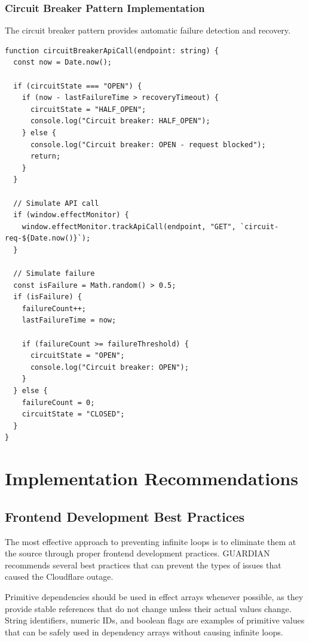 \documentclass[10pt]{article}
\begin{document}
\subsubsection{Circuit Breaker Pattern Implementation}

The circuit breaker pattern provides automatic failure detection and recovery.

\begin{lstlisting}[caption={Circuit Breaker Pattern Implementation}]
function circuitBreakerApiCall(endpoint: string) {
  const now = Date.now();
  
  if (circuitState === "OPEN") {
    if (now - lastFailureTime > recoveryTimeout) {
      circuitState = "HALF_OPEN";
      console.log("Circuit breaker: HALF_OPEN");
    } else {
      console.log("Circuit breaker: OPEN - request blocked");
      return;
    }
  }

  // Simulate API call
  if (window.effectMonitor) {
    window.effectMonitor.trackApiCall(endpoint, "GET", `circuit-req-${Date.now()}`);
  }

  // Simulate failure
  const isFailure = Math.random() > 0.5;
  if (isFailure) {
    failureCount++;
    lastFailureTime = now;
    
    if (failureCount >= failureThreshold) {
      circuitState = "OPEN";
      console.log("Circuit breaker: OPEN");
    }
  } else {
    failureCount = 0;
    circuitState = "CLOSED";
  }
}
\end{lstlisting}

\section{Implementation Recommendations}

\subsection{Frontend Development Best Practices}

The most effective approach to preventing infinite loops is to eliminate them at the source through proper frontend development practices. GUARDIAN recommends several best practices that can prevent the types of issues that caused the Cloudflare outage.

Primitive dependencies should be used in effect arrays whenever possible, as they provide stable references that do not change unless their actual values change. String identifiers, numeric IDs, and boolean flags are examples of primitive values that can be safely used in dependency arrays without causing infinite loops.
\end{document}
